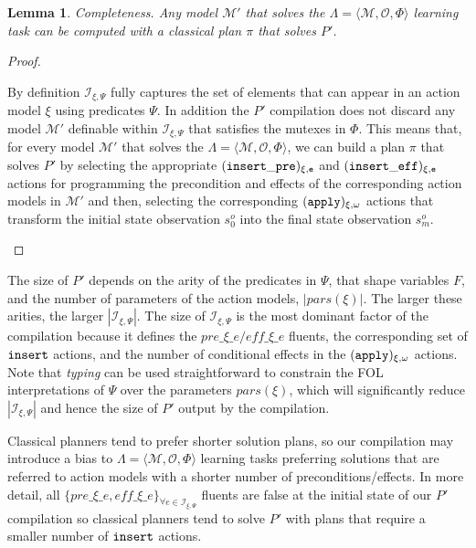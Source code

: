\documentclass{article}
\newcommand{\tup}[1]{{\langle #1 \rangle}}
\newtheorem{mylemma}[mytheorem]{Lemma}
\begin{document}
\begin{mylemma}
Completeness. Any model $\mathcal{M}'$ that solves the $\Lambda=\tup{\mathcal{M},{\mathcal O},\Phi}$ learning task can be computed with a classical plan $\pi$ that solves $P'$.
\end{mylemma}

\begin{proof}[Proof]
\begin{small}
By definition ${\mathcal I}_{\xi,\Psi}$ fully captures the set of elements that can appear in an action model $\xi$ using predicates $\Psi$. In addition the $P'$ compilation does not discard any model $\mathcal{M}'$ definable within ${\mathcal I}_{\xi,\Psi}$ that satisfies the mutexes in $\Phi$. This means that, for every model $\mathcal{M}'$ that solves the $\Lambda=\tup{\mathcal{M},{\mathcal O},\Phi}$, we can build a plan $\pi$ that solves $P'$ by selecting the appropriate ${\tt \small (insert\_pre)_{\xi,e}}$ and ${\tt \small (insert\_eff)_{\xi,e}}$ actions for programming the precondition and effects of the corresponding action models in $\mathcal{M}'$ and then, selecting the corresponding ${\tt \small (apply)_{\xi,\omega}}$ actions that transform the initial state observation $s_0^o$ into the final state observation $s_m^o$.
\end{small}
\end{proof}

The size of $P'$ depends on the arity of the predicates in $\Psi$, that shape variables $F$, and the number of parameters of the action models, $|pars(\xi)|$. The larger these arities, the larger $|{\mathcal I}_{\xi,\Psi}|$. The size of ${\mathcal I}_{\xi,\Psi}$ is the most dominant factor of the compilation because it defines the $pre\_\xi\_e/eff\_\xi\_e$ fluents, the corresponding set of ${\tt \small insert}$ actions, and the number of conditional effects in the ${\tt \small (apply)_{\xi,\omega}}$ actions. Note that {\em typing} can be used straightforward to constrain the FOL interpretations of $\Psi$ over the parameters $pars(\xi)$, which will significantly reduce $|{\mathcal I}_{\xi,\Psi}|$ and hence the size of $P'$ output by the compilation.

Classical planners tend to prefer shorter solution plans, so our compilation may introduce a bias to $\Lambda=\tup{\mathcal{M},{\mathcal O},\Phi}$ learning tasks preferring solutions that are referred to action models with a shorter number of preconditions/effects. In more detail, all $\{pre\_\xi\_e, eff\_\xi\_e\}_{\forall e\in{\mathcal I}_{\xi,\Psi}}$ fluents are false at the initial state of our $P'$ compilation so classical planners tend to solve $P'$ with plans that require a smaller number of ${\tt{\small insert}}$ actions.
\end{document}
